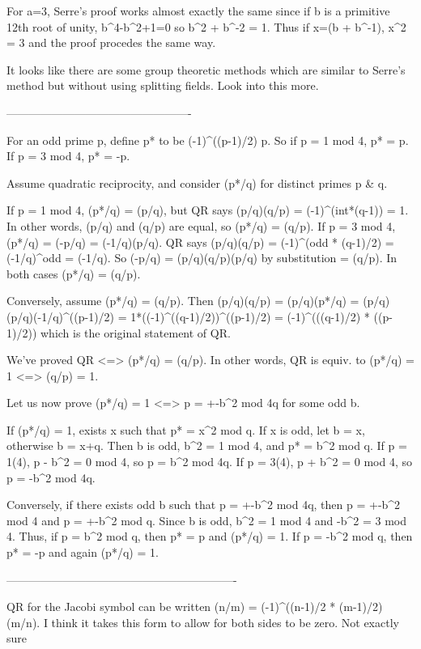 For a=3, Serre's proof works almost exactly the same since if b is a primitive 12th root of unity, b^4-b^2+1=0 so b^2 + b^-2 = 1. Thus if x=(b + b^-1), x^2 = 3 and the proof procedes the same way.

It looks like there are some group theoretic methods which are similar to Serre's method but without using splitting fields. Look into this more.

-------------------------------------------------

For an odd prime p, define p* to be (-1)^((p-1)/2) p. So if p = 1 mod 4, p* = p. If p = 3 mod 4, p* = -p.

Assume quadratic reciprocity, and consider (p*/q) for distinct primes p & q.

If p = 1 mod 4, (p*/q) = (p/q), but QR says (p/q)(q/p) = (-1)^(int*(q-1)) = 1.
  In other words, (p/q) and (q/p) are equal, so (p*/q) = (q/p).
If p = 3 mod 4, (p*/q) = (-p/q) = (-1/q)(p/q). QR says
  (p/q)(q/p) = (-1)^(odd * (q-1)/2)
             = (-1/q)^odd
             = (-1/q).
  So (-p/q) = (p/q)(q/p)(p/q) by substitution
            = (q/p). In both cases (p*/q) = (q/p).

Conversely, assume (p*/q) = (q/p).
Then (p/q)(q/p) = (p/q)(p*/q)
                = (p/q)(p/q)(-1/q)^((p-1)/2)
                = 1*((-1)^((q-1)/2))^((p-1)/2)
                = (-1)^(((q-1)/2) * ((p-1)/2))
which is the original statement of QR.

We've proved QR <=> (p*/q) = (q/p).
In other words, QR is equiv. to (p*/q) = 1 <=> (q/p) = 1.

Let us now prove (p*/q) = 1 <=> p = +-b^2 mod 4q for some odd b.

If (p*/q) = 1, exists x such that p* = x^2 mod q. If x is odd,
let b = x, otherwise b = x+q. Then b is odd, b^2 = 1 mod 4, and
p* = b^2 mod q.
  If p = 1(4), p - b^2 = 0 mod 4, so p = b^2 mod 4q.
  If p = 3(4), p + b^2 = 0 mod 4, so p = -b^2 mod 4q.

Conversely, if there exists odd b such that
p = +-b^2 mod 4q, then
p = +-b^2 mod 4 and p = +-b^2 mod q.
Since b is odd, b^2 = 1 mod 4 and -b^2 = 3 mod 4.
Thus, if p = b^2 mod q, then p* = p and (p*/q) = 1.
If p = -b^2 mod q, then p* = -p and again (p*/q) = 1.

-------------------------------------------------------------

QR for the Jacobi symbol can be written
  (n/m) = (-1)^((n-1)/2 * (m-1)/2) (m/n).
I think it takes this form to allow for both sides to be zero. Not exactly sure

